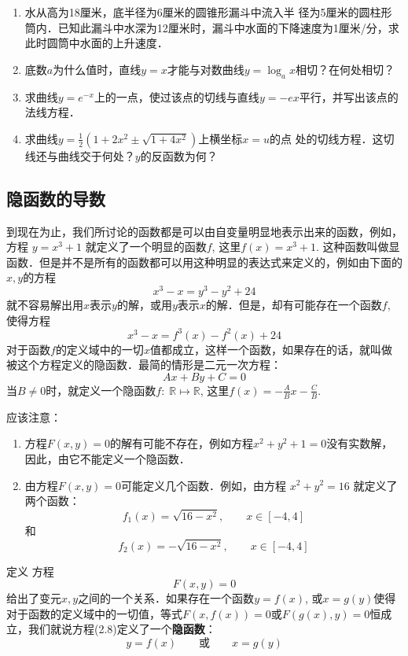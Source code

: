 \begin{ex}
\begin{enumerate}
\item 水从高为18厘米，底半径为6厘米的圆锥形漏斗中流入半
径为5厘米的圆柱形筒内．已知此漏斗中水深为12厘米时，漏斗中水面的下降速度为1厘米/分，求此时圆筒中水面的上升速度．
\item 底数$a$为什么值时，直线$y=x$才能与对数曲线$y=\log_a x$相切？在何处相切？
\item 求曲线$y=e^{-x}$上的一点，使过该点的切线与直线$y=-ex$平行，并写出该点的法线方程．
\item 求曲线$y=\frac{1}{2}(1+2x^2\pm \sqrt{1+4x^2})$上横坐标$x=u$的点
处的切线方程．这切线还与曲线交于何处？$y$的反函数为何？
\end{enumerate}    
\end{ex}

\subsection{隐函数的导数}

到现在为止，我们所讨论的函数都是可以由自变量明显地表示出来的函数，例如，方程
$y=x^3+1$
就定义了一个明显的函数$f$, 这里$f(x)=x^3+1$. 这种函数叫做显函数．但是并不是所有的函数都可以用这种明显的表达式来定义的，例如由下面的$x,y$的方程
\[x^3-x=y^3-y^2+24\]
就不容易解出用$x$表示$y$的解，或用$y$表示$x$的解．但是，却有可能存在一个函数$f$, 使得方程
\[x^3-x=f^3(x)-f^2(x)+24\]
对于函数$f$的定义域中的一切$x$值都成立，这样一个函数，如果存在的话，就叫做被这个方程定义的隐函数．最简的情形是二元一次方程：
\[Ax+By+C=0\]
当$B\ne 0$时，就定义一个隐函数$f:\; \mathbb{R}\mapsto \mathbb{R}$, 这里$f(x)=-\frac{A}{B}x-\frac{C}{B}$. 

应该注意：
\begin{enumerate}
\item 方程$F(x,y)=0$的解有可能不存在，例如方程$x^2+y^2+1=0$没有实数解，因此，由它不能定义一个隐函数．
\item 由方程$F(x,y)=0$可能定义几个函数．例如，由方程
$x^2+y^2=16$
就定义了两个函数：
\[f_1 (x) =\sqrt{16-x^2},\qquad x\in [-4, 4] \]
和
\[f_2 (x) =-\sqrt{16-x^2},\qquad x\in  [-4, 4] \]
\end{enumerate}

\begin{blk}
    {定义} 方程
    \begin{equation}
 F (x,y) =0       
    \end{equation}
给出了变元$x,y$之间的一个关系．如果存在一个函数$y=
f(x)$, 或$x=g(y)$使得对于函数的定义域中的一切值，等式$F(x,f(x))=0$或$F(g(x),y)=0$恒成立，我们就说方程(2.8)定义了一个\textbf{隐函数}：
\[y=f(x)\qquad \text{或}\qquad x=g(y)\]
\end{blk}

